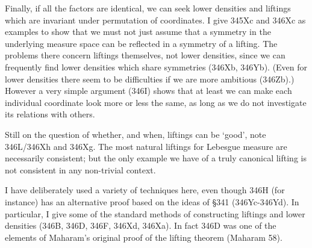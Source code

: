 {Finally, if all the factors are identical, we can seek lower densities
and liftings which are invariant under permutation of coordinates.
I give 345Xc and 346Xc as examples to show that we must not just assume
that a symmetry in the underlying measure space can be reflected in a
symmetry of a lifting.   The problems there concern liftings themselves,
not lower densities, since we can frequently find lower densities which
share symmetries (346Xb, 346Yb).   (Even for lower densities
there seem to be difficulties if we are more ambitious (346Zb).)
However a very simple argument (346I) shows that at least we can make
each individual coordinate look more or less the same, as long as we do
not investigate its relations with others.

Still on the question of whether, and when, liftings can be `good', note
346L/346Xh and 346Xg.   The most natural liftings for Lebesgue
measure are necessarily consistent;  but the only example we have of a
truly canonical lifting is not consistent in any non-trivial context.

I have deliberately used a variety of techniques here, even though 346H
(for instance) has an alternative proof based on the ideas of \S341
(346Yc-346Yd).   In particular, I give some of the standard methods of
constructing liftings and lower densities (346B, 346D, 346F, 346Xd,
346Xa).   In fact 346D was one of the elements of Maharam's original
proof of the lifting theorem ({\smc Maharam 58}).
}%

\frnewpage


